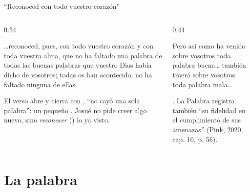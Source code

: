 \begin{frame}{``Reconoced con todo vuestro corazón''}
\begin{columns}[t,onlytextwidth]
\begin{column}{0.54\textwidth}
\begin{cita}\ldots{}reconoced, pues, con todo vuestro corazón y con toda vuestra alma, que no ha faltado una palabra de todas las buenas palabras que \SENOR{} vuestro Dios había dicho de vosotros; todas os han acontecido, no ha faltado ninguna de ellas.\end{cita}
\scriptsize El verso abre y cierra con , ``no cayó una sola palabra'': un pequeño . Josué no pide creer algo nuevo, sino \emph{reconocer} () lo ya visto.
\end{column}
\begin{column}{0.44\textwidth}
\begin{cita}Pero así como ha venido sobre vosotros toda palabra buena\ldots{} también traerá \SENOR{} sobre vosotros toda palabra mala\ldots{}\end{cita}
\scriptsize{}. La Palabra registra también ``su fidelidad en el cumplimiento de sus amenazas'' (Pink, 2020, cap. 10, p. 56).
\end{column}
\end{columns}
\end{frame}

\section{La palabra}

